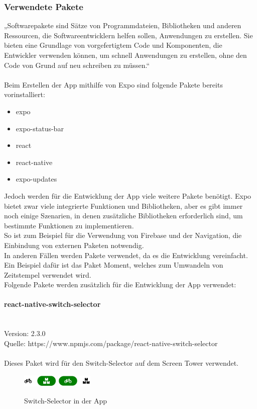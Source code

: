 \subsubsection{Verwendete Pakete}
„Softwarepakete sind Sätze von Programmdateien, Bibliotheken und anderen Ressourcen, die Softwareentwicklern helfen sollen, Anwendungen zu erstellen. Sie bieten eine Grundlage von vorgefertigtem Code und Komponenten, die Entwickler verwenden können, um schnell Anwendungen zu erstellen, ohne den Code von Grund auf neu schreiben zu müssen.“  \\ \\
Beim Erstellen der App mithilfe von Expo sind folgende Pakete bereits vorinstalliert:\\
\begin{itemize}
  \item expo
  \item expo-status-bar
  \item react
  \item react-native
  \item expo-updates
\end{itemize}
Jedoch werden für die Entwicklung der App viele weitere Pakete benötigt. Expo bietet zwar viele integrierte Funktionen und Bibliotheken, aber es gibt immer noch einige Szenarien, in denen zusätzliche Bibliotheken erforderlich sind, um bestimmte Funktionen zu implementieren.\\
So ist zum Beispiel für die Verwendung von Firebase und der Navigation, die Einbindung von externen Paketen notwendig.\\
In anderen Fällen werden Pakete verwendet, da es die Entwicklung vereinfacht. Ein Beispiel dafür ist das Paket Moment, welches zum Umwandeln von Zeitstempel verwendet wird.\\
Folgende Pakete werden zusätzlich für die Entwicklung der App verwendet:\\


\paragraph{react-native-switch-selector}\mbox{}\\
Version: 2.3.0\\ Quelle: https://www.npmjs.com/package/react-native-switch-selector\\ \\
Dieses Paket wird für den Switch-Selector auf dem Screen Tower verwendet. \\
\begin{figure}[H]
  \centering
  \includegraphics[width=0.15\textwidth]{images/app-screenshots/switchselector.png}
  \includegraphics[width=0.15\textwidth]{images/app-screenshots/switchselector2.png}
  \caption{Switch-Selector in der App}
  \label{fig:switchselector}
\end{figure}

